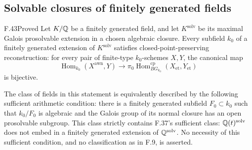 \subsection{Solvable closures of finitely generated fields}

\begin{claim}{F.43}{Proved}
Let $K/\mathbb Q$ be a finitely generated field, and let
$K^{\mathrm{solv}}$ be its maximal Galois prosolvable
extension in a chosen algebraic closure. Every subfield $k_0$
of a finitely generated extension of $K^{\mathrm{solv}}$
satisfies closed-point-preserving reconstruction: for every
pair of finite-type $k_0$-schemes $X,Y$, the canonical map
\[
 \operatorname{Hom}_{k_0}(X^{\mathrm{awn}},Y)
 \longrightarrow
 \pi_0\operatorname{Hom}^{\mathrm{cp}}_{BG_{k_0}}
       (X_{\mathrm{et}},Y_{\mathrm{et}})
\]
is bijective.

The class of fields in this statement is equivalently described
by the following sufficient arithmetic condition: there is a
finitely generated subfield $F_0\subset k_0$ such that
$k_0/F_0$ is algebraic and the Galois group of its normal
closure has an open prosolvable subgroup. This class strictly
contains F.37's sufficient class: $\mathbb Q(t)^{\mathrm{solv}}$
does not embed in a finitely generated extension of
$\mathbb Q^{\mathrm{solv}}$. No necessity of this sufficient
condition, and no classification as in F.9, is asserted.
\end{claim}
